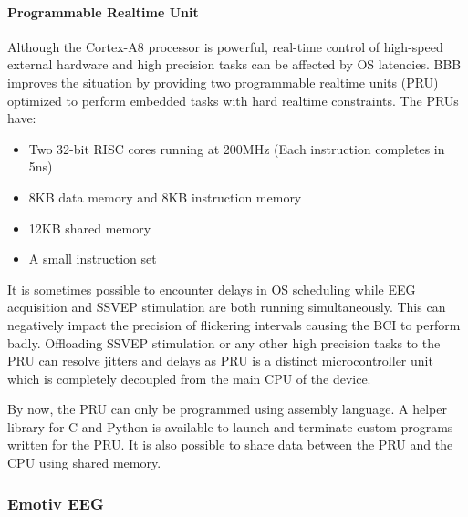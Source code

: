 \documentclass[12pt]{article}
\newcommand\mysubsubsection[1]{\subsubsection{#1}}
\newcommand\mysubsubsubsection[1]{\paragraph{#1}\hspace{0pt}}
\numberwithin{equation}{section}
\numberwithin{figure}{section}
\numberwithin{table}{section}
\begin{document}
\mysubsubsubsection{Programmable Realtime Unit}
\par{
    Although the Cortex-A8 processor is powerful, real-time control of high-speed external hardware
    and high precision tasks can be affected by OS latencies. BBB improves the
    situation by providing two programmable realtime units (PRU) optimized to perform embedded tasks
    with hard realtime constraints. The PRUs have:
    \begin{itemize}
        \item Two 32-bit RISC cores running at 200MHz (Each instruction completes in 5ns)
        \item 8KB data memory and 8KB instruction memory
        \item 12KB shared memory
        \item A small instruction set
    \end{itemize}
    It is sometimes possible to encounter delays in OS scheduling while EEG
    acquisition and SSVEP stimulation are both running simultaneously. This can negatively
    impact the precision of flickering intervals causing the BCI to perform badly.
    Offloading SSVEP stimulation or any other high precision tasks to the
    PRU can resolve jitters and delays as PRU is a distinct
    microcontroller unit which is completely decoupled from the main CPU of the device.
}
\par{
    By now, the PRU can only be programmed using assembly language. A helper library
    for C and Python is available to launch and terminate custom programs written for the PRU.
    It is also possible to share data between the PRU and the CPU using shared memory.
}

\mysubsubsection{Emotiv EEG}
\end{document}
